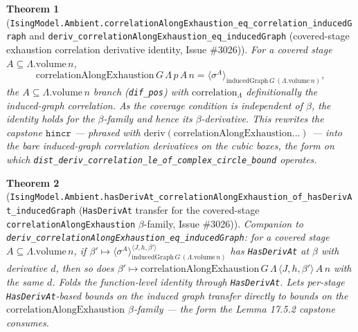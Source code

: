 \documentclass[a4paper,11pt]{article}
\newtheorem{theorem}{Theorem}
\begin{document}
\begin{theorem}[\texttt{IsingModel.Ambient.correlationAlongExhaustion\_eq\_correlation\_inducedGraph}
and \texttt{deriv\_correlationAlongExhaustion\_eq\_inducedGraph} (covered-stage exhaustion
correlation derivative identity, Issue \#3026)]
For a covered stage $A\subseteq\Lambda.\mathrm{volume}\,n$,
\[
  \mathrm{correlationAlongExhaustion}\,G\,\Lambda\,p\,A\,n
    = \langle\sigma^{A}\rangle_{\mathrm{inducedGraph}\,G\,(\Lambda.\mathrm{volume}\,n)},
\]
the $A\subseteq\Lambda.\mathrm{volume}\,n$ branch (\texttt{dif\_pos}) with $\mathrm{correlation}_\Lambda$
definitionally the induced-graph correlation. As the coverage condition is independent of
$\beta$, the identity holds for the $\beta$-family and hence its $\beta$-derivative. This
rewrites the capstone $\mathtt{hincr}$ — phrased with
$\mathrm{deriv}(\mathrm{correlationAlongExhaustion}\dots)$ — into the bare induced-graph
correlation derivatives on the cubic boxes, the form on which
\texttt{dist\_deriv\_correlation\_le\_of\_complex\_circle\_bound} operates.
\end{theorem}

\begin{theorem}[\texttt{IsingModel.Ambient.hasDerivAt\_correlationAlongExhaustion\_of\_hasDerivAt\_inducedGraph}
(\texttt{HasDerivAt} transfer for the covered-stage \texttt{correlationAlongExhaustion}
$\beta$-family, Issue \#3026)]
Companion to \texttt{deriv\_correlationAlongExhaustion\_eq\_inducedGraph}: for a covered
stage $A\subseteq\Lambda.\mathrm{volume}\,n$, if
$\beta'\mapsto\langle\sigma^A\rangle_{\mathrm{inducedGraph}\,G\,(\Lambda.\mathrm{volume}\,n)}^{\langle J,h,\beta'\rangle}$
has \texttt{HasDerivAt} at $\beta$ with derivative $d$, then so does
$\beta'\mapsto\mathrm{correlationAlongExhaustion}\,G\,\Lambda\,\langle J,h,\beta'\rangle\,A\,n$
with the same $d$. Folds the function-level identity through \texttt{HasDerivAt}. Lets
per-stage \texttt{HasDerivAt}-based bounds on the induced graph transfer directly to bounds
on the $\mathrm{correlationAlongExhaustion}$ $\beta$-family — the form the Lemma 17.5.2
capstone consumes.
\end{theorem}
\end{document}
